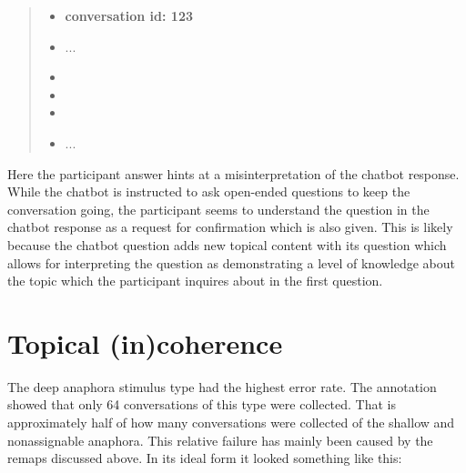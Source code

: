     \begin{quote}
    \begin{itemize}[label={}, leftmargin=0pt, itemsep=0.5em]
    \item \textbf{conversation id: 123}
    \item ...
    \item {}
    \item {}
    \item {}
    \item ...
    \end{itemize}
    \end{quote}

Here the participant answer hints at a misinterpretation of the chatbot response.
While the chatbot is instructed to ask open-ended questions to keep the conversation going,
the participant seems to understand the question in the chatbot response
as a request for confirmation which is also given.
This is likely because the chatbot question adds new topical content with its question
which allows for interpreting the question as demonstrating a level of knowledge about the topic
which the participant inquires about in the first question.

\section{Topical (in)coherence}


    The deep anaphora stimulus type had the highest error rate.
    The annotation showed that only 64 conversations of this type were collected.
    That is approximately half of how many conversations were collected of the shallow and nonassignable anaphora.
    This relative failure has mainly been caused by the remaps discussed above.
    In its ideal form it looked something like this:

